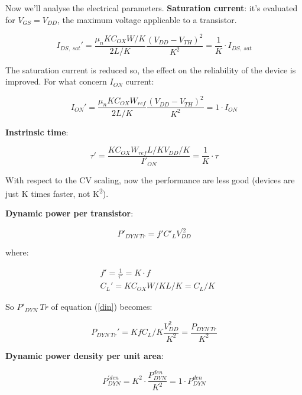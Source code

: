 \documentclass[a4paper, 12pt, twoside, openright]{report}
\newcommand{\super}{\textsuperscript}
\begin{document}
\begin{enumerate}
Now we'll analyse the electrical parameters.
\textbf{Saturation current}: it's evaluated for $V_{GS} = V_{DD}$, the maximum voltage applicable to a transistor.

	\begin{equation}
	I_{DS,\ sat}' = \frac{\mu_n K C_{OX} W/K}{2 L/K}\frac{(V_{DD} - V_{TH})^2}{K^2} = \frac{1}{K} \cdot I_{DS,\ sat}
	\label{}
	\end{equation}

The saturation current is reduced so, the effect on the reliability of the device is improved. For what concern $I_{ON}$ current:

	\begin{equation}
	I_{ON}' = \frac{\mu_n K C_{OX} W_{ref}}{2 L/K}\frac{(V_{DD} - V_{TH})^2}{K^2} = 1 \cdot I_{ON}
	\end{equation}

\textbf{Instrinsic time}:

	\begin{equation}
	\tau ' = \frac{K C_{OX} W_{ref} L/K V_{DD}/K}{I'_{ON}} = \frac{1}{K} \cdot \tau
	\end{equation}

With respect to the CV scaling, now the performance are less good (devices are just K times faster, not K\super{2}).

\textbf{Dynamic power per transistor}:

	\begin{equation}
	P'_{DYN \ Tr} =f' C'_L V_{DD}^{'2}
	\label{din}
	\end{equation}

where:

	\begin{align}
	&f' = \frac{1}{\tau'} = K \cdot f \\
	&C_L ' = K C_{OX} W/K L/K = C_L/K
	\end{align}

So $P'_{DYN} \ Tr$ of equation (\ref{din}) becomes:

	\begin{equation}
	P_{DYN \ Tr}' =  K f C_L/K \frac{V_{DD}^2}{K^2} = \frac{P_{DYN \ Tr}}{K^2}
	\end{equation}

\textbf{Dynamic power density per unit area}:

	\begin{equation}
	P^{'den}_{DYN} = K^2 \cdot \frac{P^{den}_{DYN}}{K^2} = 1 \cdot P^{den}_{DYN}
	\end{equation}


\end{enumerate}
\end{document}
